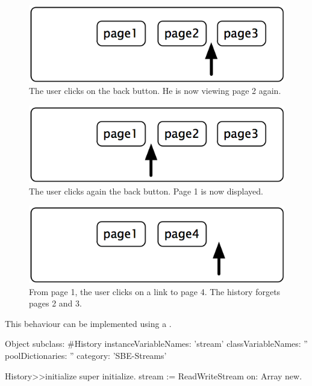 \documentclass[a4paper,10pt,twoside]{book}
\begin{document}
\begin{figure}[!ht]
\centerline{\includegraphics[scale=0.5]{page2_Stef}}
\caption{The user clicks on the back button. He is now viewing page 2 again.}
\label{fig:page2_}
\vspace{.2in}
\end{figure}

\begin{figure}[!ht]
\centerline{\includegraphics[scale=0.5]{page1_Stef}}
\caption{The user clicks again the back button. Page 1 is now displayed.}
\label{fig:page1_}
\vspace{.2in}
\end{figure}

\begin{figure}[!ht]
\centerline{\includegraphics[scale=0.5]{page4Stef}}
\caption{From page 1, the user clicks on a link to page 4. The history forgets pages 2 and 3.}
\label{fig:page4}
\vspace{.2in}
\end{figure}

This behaviour can be implemented using a .

\begin{code}{}
Object subclass: #History
  instanceVariableNames: 'stream'
  classVariableNames: ''
  poolDictionaries: ''
  category: 'SBE-Streams'

History>>initialize
    super initialize.
    stream := ReadWriteStream on: Array new.
\end{code}
\end{document}
